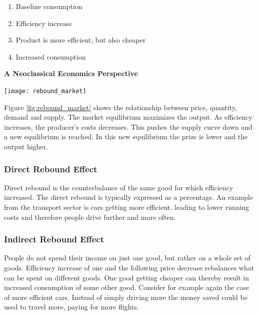 \begin{enumerate}
    \item Baseline consumption
    \item Efficiency increase
    \item Product is more efficient, but also cheaper
    \item Increased consumption
\end{enumerate}

\begin{tcolorbox}
    \textbf{A Neoclassical Economics Perspective}\\

        \begin{center}
        \texttt{[image: rebound\_market]}
        \
        \label{fig:rebound_market}
        \end{center}

    Figure \ref{fig:rebound_market} shows the relationship between price, quantity, demand and supply.
    The market equilibrium maximizes the output.
    As efficiency increases, the producer's costs decreases.
    This pushes the supply curve down and a new equilibrium is reached.
    In this new equilibrium the prize is lower and the output higher.
\end{tcolorbox}

\subsubsection{Direct Rebound Effect}
Direct rebound is the counterbalance of the same good for which efficiency increased.
The direct rebound is typically expressed as a percentage.
An example from the transport sector is cars getting more efficient, leading to lower running costs and therefore people drive further and more often.

\subsubsection{Indirect Rebound Effect}
People do not spend their income on just one good, but rather on a whole set of goods.
Efficiency increase of one and the following price decrease rebalances what can be spent on different goods.
One good getting cheaper can thereby result in increased consumption of some other good.
Consider for example again the case of more efficient cars.
Instead of simply driving more the money saved could be used to travel more, paying for more flights.

